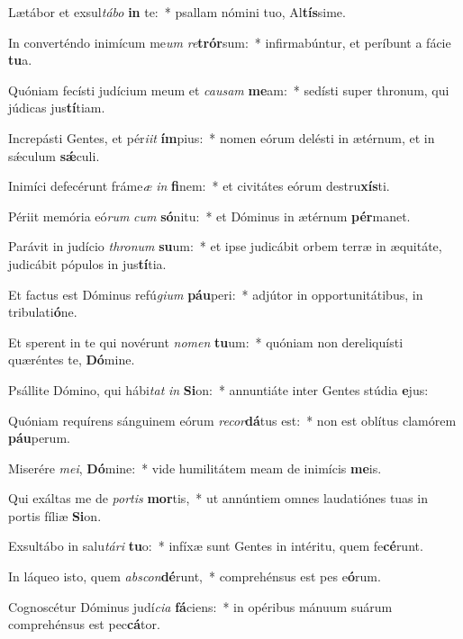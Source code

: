 \item Lætábor et exsul\textit{tá}\textit{bo} \textbf{in} te:~* psallam nómini tuo, Al\textbf{tís}sime.
\item In converténdo inimícum me\textit{um} \textit{re}\textbf{trór}sum:~* infirmabúntur, et períbunt a fácie \textbf{tu}a.
\item Quóniam fecísti judícium meum et \textit{cau}\textit{sam} \textbf{me}am:~* sedísti super thronum, qui júdicas jus\textbf{tí}tiam.
\item Increpásti Gentes, et pér\textit{i}\textit{it} \textbf{ím}pius:~* nomen eórum delésti in ætérnum, et in sǽculum \textbf{sǽ}culi.
\item Inimíci defecérunt fráme\textit{æ} \textit{in} \textbf{fi}nem:~* et civitátes eórum destru\textbf{xís}ti.
\item Périit memória eó\textit{rum} \textit{cum} \textbf{só}nitu:~* et Dóminus in ætérnum \textbf{pér}manet.
\item Parávit in judício \textit{thro}\textit{num} \textbf{su}um:~* et ipse judicábit orbem terræ in æquitáte, judicábit pópulos in jus\textbf{tí}tia.
\item Et factus est Dóminus refú\textit{gi}\textit{um} \textbf{páu}peri:~* adjútor in opportunitátibus, in tribulati\textbf{ó}ne.
\item Et sperent in te qui novérunt \textit{no}\textit{men} \textbf{tu}um:~* quóniam non dereliquísti quæréntes te, \textbf{Dó}mine.
\item Psállite Dómino, qui hábi\textit{tat} \textit{in} \textbf{Si}on:~* annuntiáte inter Gentes stúdia \textbf{e}jus:
\item Quóniam requírens sánguinem eórum \textit{re}\textit{cor}\textbf{dá}tus est:~* non est oblítus clamórem \textbf{páu}perum.
\item Miserére \textit{me}\textit{i}, \textbf{Dó}mine:~* vide humilitátem meam de inimícis \textbf{me}is.
\item Qui exáltas me de \textit{por}\textit{tis} \textbf{mor}tis,~* ut annúntiem omnes laudatiónes tuas in portis fíliæ \textbf{Si}on.
\item Exsultábo in salu\textit{tá}\textit{ri} \textbf{tu}o:~* infíxæ sunt Gentes in intéritu, quem fe\textbf{cé}runt.
\item In láqueo isto, quem \textit{abs}\textit{con}\textbf{dé}runt,~* comprehénsus est pes e\textbf{ó}rum.
\item Cognoscétur Dóminus judí\textit{ci}\textit{a} \textbf{fá}ciens:~* in opéribus mánuum suárum comprehénsus est pec\textbf{cá}tor.
